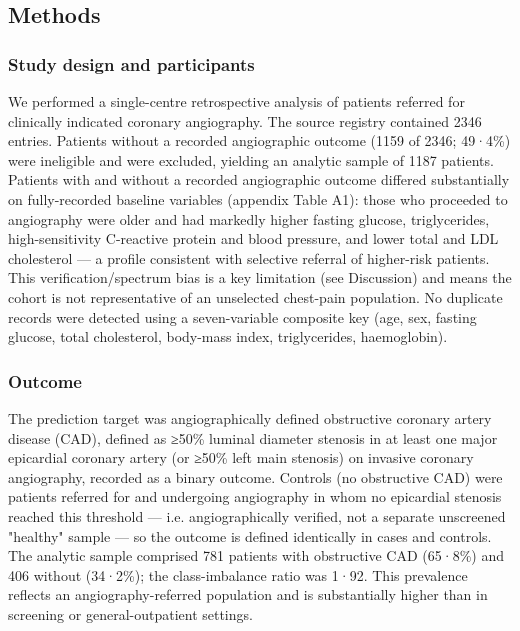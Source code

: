 \documentclass[
  english,
  11pt,
]{article}
\begin{document}
\subsection{Methods}\label{methods}

\subsubsection{Study design and
participants}\label{study-design-and-participants}

We performed a single-centre retrospective analysis of patients referred
for clinically indicated coronary angiography. The source registry
contained 2346 entries. Patients without a recorded angiographic outcome
(1159 of 2346; 49·4\%) were ineligible and were excluded, yielding an
analytic sample of 1187 patients. Patients with and without a recorded
angiographic outcome differed substantially on fully-recorded baseline
variables (appendix Table A1): those who proceeded to angiography were
older and had markedly higher fasting glucose, triglycerides,
high-sensitivity C-reactive protein and blood pressure, and lower total
and LDL cholesterol --- a profile consistent with selective referral of
higher-risk patients. This verification/spectrum bias is a key
limitation (see Discussion) and means the cohort is not representative
of an unselected chest-pain population. No duplicate records were
detected using a seven-variable composite key (age, sex, fasting
glucose, total cholesterol, body-mass index, triglycerides,
haemoglobin).

\subsubsection{Outcome}\label{outcome}

The prediction target was angiographically defined obstructive coronary
artery disease (CAD), defined as ≥50\% luminal diameter stenosis in at
least one major epicardial coronary artery (or ≥50\% left main stenosis)
on invasive coronary angiography, recorded as a binary outcome. Controls
(no obstructive CAD) were patients referred for and undergoing
angiography in whom no epicardial stenosis reached this threshold ---
i.e. angiographically verified, not a separate unscreened "healthy"
sample --- so the outcome is defined identically in cases and controls.
The analytic sample comprised 781 patients with obstructive CAD (65·8\%)
and 406 without (34·2\%); the class-imbalance ratio was 1·92. This
prevalence reflects an angiography-referred population and is
substantially higher than in screening or general-outpatient settings.
\end{document}
